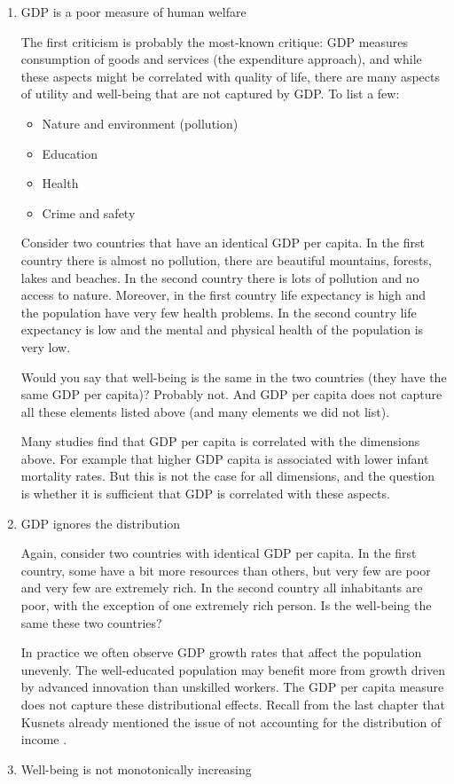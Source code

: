 \documentclass[]{book}
\providecommand{\tightlist}{%
  \setlength{\itemsep}{0pt}\setlength{\parskip}{0pt}}
\begin{document}
\begin{enumerate}
\def\labelenumi{\arabic{enumi}.}
\item
  GDP is a poor measure of human welfare

  The first criticism is probably the most-known critique: GDP measures consumption of goods and services (the expenditure approach), and while these aspects might be correlated with quality of life, there are many aspects of utility and well-being that are not captured by GDP. To list a few:

  \begin{itemize}
  \tightlist
  \item
    Nature and environment (pollution)
  \item
    Education
  \item
    Health
  \item
    Crime and safety
  \end{itemize}

  Consider two countries that have an identical GDP per capita. In the first country there is almost no pollution, there are beautiful mountains, forests, lakes and beaches. In the second country there is lots of pollution and no access to nature. Moreover, in the first country life expectancy is high and the population have very few health problems. In the second country life expectancy is low and the mental and physical health of the population is very low.

  Would you say that well-being is the same in the two countries (they have the same GDP per capita)? Probably not. And GDP per capita does not capture all these elements listed above (and many elements we did not list).

  Many studies find that GDP per capita is correlated with the dimensions above. For example that higher GDP capita is associated with lower infant mortality rates. But this is not the case for all dimensions, and the question is whether it is sufficient that GDP is correlated with these aspects.
\item
  GDP ignores the distribution

  Again, consider two countries with identical GDP per capita. In the first country, some have a bit more resources than others, but very few are poor and very few are extremely rich. In the second country all inhabitants are poor, with the exception of one extremely rich person. Is the well-being the same these two countries?

  In practice we often observe GDP growth rates that affect the population unevenly. The well-educated population may benefit more from growth driven by advanced innovation than unskilled workers. The GDP per capita measure does not capture these distributional effects. Recall from the last chapter that Kusnets already mentioned the issue of not accounting for the distribution of income \citep[page 6 in][]{kuznets1934national}.
\item
  Well-being is not monotonically increasing


\end{enumerate}
\end{document}
